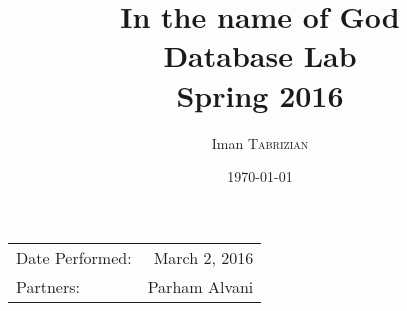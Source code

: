 \documentclass{article}
\title{In the name of God \\ Database Lab \\ Spring 2016} %
\author{Iman \textsc{Tabrizian}} %
\date{\today} %
\begin{document}
\maketitle %

\begin{center}
	\begin{tabular}{l r}
		Date Performed: & March 2, 2016 \\ %
		Partners: & Parham Alvani \\ %
	\end{tabular}
\end{center}


\end{document}

